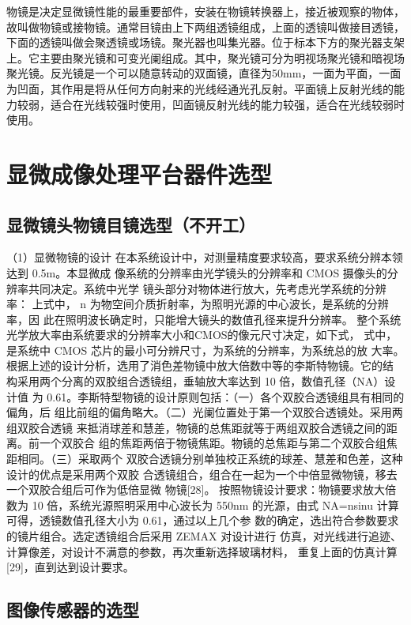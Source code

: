物镜是决定显微镜性能的最重要部件，安装在物镜转换器上，接近被观察的物体，故叫做物镜或接物镜。通常目镜由上下两组透镜组成，上面的透镜叫做接目透镜，下面的透镜叫做会聚透镜或场镜。聚光器也叫集光器。位于标本下方的聚光器支架上。它主要由聚光镜和可变光阑组成。其中，聚光镜可分为明视场聚光镜和暗视场聚光镜。反光镜是一个可以随意转动的双面镜，直径为50mm，一面为平面，一面为凹面，其作用是将从任何方向射来的光线经通光孔反射。平面镜上反射光线的能力较弱，适合在光线较强时使用，凹面镜反射光线的能力较强，适合在光线较弱时使用。

\section{显微成像处理平台器件选型}
\subsection{显微镜头物镜目镜选型（不开工）}
（1）显微物镜的设计 在本系统设计中，对测量精度要求较高，要求系统分辨本领达到 0.5m。本显微成 像系统的分辨率由光学镜头的分辨率和 CMOS 摄像头的分辨率共同决定。系统中光学 镜头部分对物体进行放大，先考虑光学系统的分辨率：
上式中， n 为物空间介质折射率，为照明光源的中心波长，是系统的分辨率，因 此在照明波长确定时，只能增大镜头的数值孔径来提升分辨率。 整个系统光学放大率由系统要求的分辨率大小和CMOS的像元尺寸决定，如下式，
式中，是系统中 CMOS 芯片的最小可分辨尺寸，为系统的分辨率，为系统总的放 大率。 根据上述的设计分析，选用了消色差物镜中放大倍数中等的李斯特物镜。它的结 构采用两个分离的双胶组合透镜组，垂轴放大率达到 10 倍，数值孔径（NA）设计值 为 0.61。李斯特型物镜的设计原则包括：（一）各个双胶合透镜组具有相同的偏角，后 组比前组的偏角略大。（二）光阑位置处于第一个双胶合透镜处。采用两组双胶合透镜 来抵消球差和慧差，物镜的总焦距就等于两组双胶合透镜之间的距离。前一个双胶合 组的焦距两倍于物镜焦距。物镜的总焦距与第二个双胶合组焦距相同。（三）采取两个 双胶合透镜分别单独校正系统的球差、慧差和色差，这种设计的优点是采用两个双胶 合透镜组合，组合在一起为一个中倍显微物镜，移去一个双胶合组后可作为低倍显微 物镜[28]。 按照物镜设计要求：物镜要求放大倍数为 10 倍，系统光源照明采用中心波长为 550nm 的光源，由式 NA=nsinu 计算可得，透镜数值孔径大小为 0.61，通过以上几个参 数的确定，选出符合参数要求的镜片组合。选定透镜组合后采用 ZEMAX 对设计进行 仿真，对光线进行追迹、计算像差，对设计不满意的参数，再次重新选择玻璃材料， 重复上面的仿真计算[29]，直到达到设计要求。
\subsection{图像传感器的选型}
